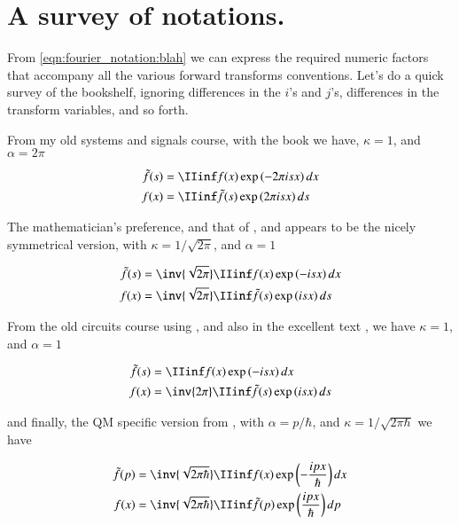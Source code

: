 \section{A survey of notations. }

From \ref{eqn:fourier_notation:blah} we can 
express the required numeric factors that accompany all the various forward transforms conventions.  Let's do a quick survey of the bookshelf, ignoring differences in the $i$'s and $j$'s, differences in the transform variables, and so forth.

From my old systems and signals course, with the book \cite{haykin1994cs} we have, $\kappa = 1$, and $\alpha = 2 \pi$

\begin{align*}
\tilde{f}(s) &= \IIinf f(x) \exp\left( - 2 \pi i s x \right) dx \\
f(x) &= \IIinf \tilde{f}(s) \exp\left( 2 \pi i s x \right) ds \\
\end{align*}

The mathematician's preference, and that of
\cite{bohm1989qt}, and \cite{byron1992mca} appears to be the nicely symmetrical version, with $\kappa = 1/\sqrt{2\pi}$, and $\alpha = 1$

\begin{align*}
\tilde{f}(s) &= \inv{\sqrt{2\pi}} \IIinf f(x) \exp\left( - i  s x \right) dx \\
f(x) &= \inv{\sqrt{2 \pi}} \IIinf \tilde{f}(s) \exp\left( i  s x \right) ds \\
\end{align*}

From the old circuits course using \cite{irwin2007bec}, and also in the excellent text \cite{lepage1980cva}, we have $\kappa = 1$, and $\alpha = 1$

\begin{align*}
\tilde{f}(s) &= \IIinf f(x) \exp\left( - i  s x \right) dx  \\
f(x) &= \inv{{2 \pi}} \IIinf \tilde{f}(s) \exp\left( i  s x \right) ds \\
\end{align*}

and finally, the QM specific version from \cite{mcmahon2005qmd}, with $\alpha = p/\hbar$, and $\kappa = 1/\sqrt{2\pi \hbar}$ we have

\begin{align*}
\tilde{f}(p) &= \inv{\sqrt{2\pi \hbar}} \IIinf f(x) \exp\left( - \frac{i  p x}{\hbar} \right) dx \\
f(x) &= \inv{\sqrt{2 \pi \hbar}} \IIinf \tilde{f}(p) \exp\left( \frac{i  p x}{\hbar} \right) dp \\
\end{align*}
